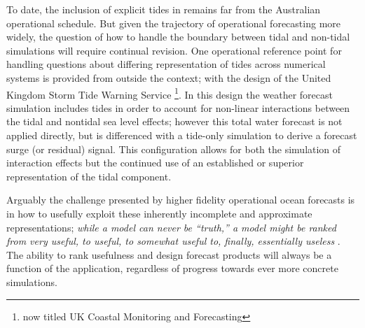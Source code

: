 To date, the inclusion of explicit tides in \BL{} remains far from the Australian operational schedule.
But given the trajectory of operational forecasting more widely, the question of how to handle the boundary between tidal and non-tidal simulations will require continual revision.
One operational reference point for handling questions about differing representation of tides across numerical systems is provided from outside the \OGCM{} context; with the design of the United Kingdom Storm Tide Warning Service \footnote{now titled UK Coastal Monitoring and Forecasting}\cite{Horsburgh:2008gw}.   In this design the weather forecast simulation includes tides in order to account for non-linear interactions between the tidal and nontidal sea level effects; however this total water forecast is not applied directly, but is differenced with a tide-only simulation to derive a forecast surge (or residual) signal.   This configuration allows for both the simulation of interaction effects but the continued use of an established or superior representation of the tidal component.


Arguably the challenge presented by higher fidelity operational ocean forecasts is in how to usefully exploit these inherently incomplete and approximate representations;  
\textit{while a model can never be “truth,” a model might be ranked from very useful, to useful, to somewhat useful to, ﬁnally, essentially useless} \citep{10.1007/978-0-387-22456-5_1}.
The ability to rank usefulness and design forecast products will always be a function of the application, regardless of progress towards ever more concrete simulations.

